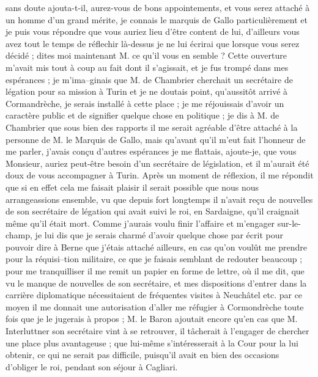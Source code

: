 \documentclass[12pt]{article}
\begin{document}
 sans doute ajouta-t-il, aurez-vous de bons
appointements, et vous serez attaché à un homme d’un grand mérite, je connais le marquis de Gallo
particulièrement et je puis vous répondre que vous auriez lieu d’être content de lui, d’ailleurs
vous avez tout le temps de réflechir là-dessus je ne lui écrirai que lorsque vous serez décidé ;
dites moi maintenant M. ce qu’il vous en semble ? Cette ouverture m’avait mis tout à coup au fait
dont il s’agissait, et je fus trompé dans mes espérances ; je m’ima–ginais que M. de Chambrier
cherchait un secrétaire de légation pour sa mission à Turin et je ne doutais point, qu’aussitôt
arrivé à Cormandrèche, je serais installé à cette place ; je me réjouissais d’avoir un caractère
public et de signifier quelque chose en politique ; je dis à M. de Chambrier que sous bien des
rapports il me serait agréable d’être attaché à la personne de M. le Marquis de Gallo, mais qu’avant
qu’il m’eut fait l’honneur de me parler, j’avais conçu d’autres espérances je me flattais,
ajoute-je, que vous Monsieur, auriez peut-être besoin d’un secrétaire de législation, et il m’aurait
été doux de vous accompagner à Turin. Après un moment de réflexion, il me répondit que si en effet
cela me faisait plaisir il serait possible que nous nous arrangeassions ensemble, vu que depuis fort
longtemps il n’avait reçu de nouvelles de son secrétaire de légation qui avait suivi le roi, en
Sardaigne, qu’il craignait même qu’il était mort. Comme j’aurais voulu finir l’affaire et m’engager
sur-le-champ, je lui dis que je serais charmé d’avoir quelque chose par écrit pour pouvoir dire à
Berne que j’étais attaché ailleurs, en cas qu’on voulût me prendre pour la réquisi–tion militaire,
ce que je faisais semblant de redouter beaucoup ; pour me tranquilliser il me remit un papier en
forme de lettre, où il me dit, que vu le manque de nouvelles de son secrétaire, et mes dispositions
d’entrer dans la carrière diplomatique nécessitaient de fréquentes visites à Neuchâtel etc. par ce
moyen il me donnait une autorisation d’aller me réfugier à Cormondrèche toute fois que je le
jugerais à propos ; M. le Baron ajoutait encore qu’en cas que M. Interluttner son secrétaire vint à
se retrouver, il tâcherait à l’engager de chercher une place plus avantageuse ; que lui-même
s’intéresserait à la Cour pour la lui obtenir, ce qui ne serait pas difficile, puisqu’il avait en
bien des occasions d’obliger le roi, pendant son séjour à Cagliari.
\end{document}
